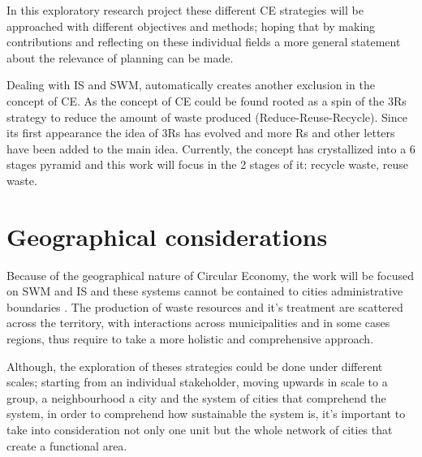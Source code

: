 In this exploratory research project these different CE strategies will be approached with different objectives and methods; hoping that by making contributions and reflecting on these individual fields a more general statement about the relevance of planning can be made.\par

Dealing with IS and SWM, automatically creates another exclusion in the concept of CE. As the concept of CE could be found rooted as a spin of the 3Rs strategy to reduce the amount of waste produced (Reduce-Reuse-Recycle). Since its first appearance the idea of 3Rs has evolved and more Rs and other letters have been added to the main idea. Currently, the concept has crystallized into a 6 stages pyramid and this work will focus in the 2 stages of it: recycle waste, reuse waste. \par



\section{Geographical considerations}
Because of the geographical nature of Circular Economy, the work will be focused on SWM and IS and these systems cannot be contained to cities administrative boundaries \parencite{Dupuy2008}. The production of waste resources and it’s treatment are scattered across the territory, with interactions across municipalities and in some cases regions, thus require to take a more holistic and comprehensive approach. \par
Although, the exploration of theses strategies could be done under different scales; starting from an individual stakeholder, moving upwards in scale to a group, a neighbourhood a city and the system of cities that comprehend the system, in order to comprehend how sustainable the system is, it's important to take into consideration not only one unit but the whole network of cities that create a functional area.\par 




